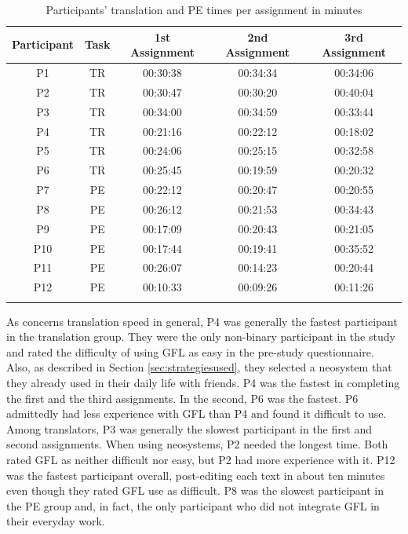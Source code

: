 \begin{table}[ht]
\caption{Participants' translation and PE times per assignment in minutes}
    \centering
    \begin{tabular}{ccccc} \lsptoprule
      \textbf{Participant} & \textbf{Task} & \textbf{1st Assignment} & \textbf{2nd Assignment} & \textbf{3rd Assignment} \\
      \midrule
       P1 & TR & \cellcolor{yellow!25}00:30:38 & \cellcolor{red!25}00:34:34 & 00:34:06 \\
       P2 & TR & 00:30:47 & \cellcolor{yellow!25}00:30:20 & \cellcolor{red!25}00:40:04 \\
       P3 & TR & 00:34:00 & \cellcolor{red!25}00:34:59 & \cellcolor{yellow!25}00:33:44 \\
       P4 & TR & 00:21:16 & \cellcolor{red!25}00:22:12 & \cellcolor{yellow!25}00:18:02 \\
       P5 & TR & \cellcolor{yellow!25}00:24:06 & 00:25:15 & \cellcolor{red!25}00:32:58 \\
       P6 & TR & \cellcolor{red!25}00:25:45 & \cellcolor{yellow!25}00:19:59 & 00:20:32 \\ \midrule
       P7 & PE & \cellcolor{red!25}00:22:12 & \cellcolor{yellow!25}00:20:47 & 00:20:55 \\
       P8 & PE & 00:26:12 & \cellcolor{yellow!25}00:21:53 & \cellcolor{red!25}00:34:43 \\
       P9 & PE & \cellcolor{yellow!25}00:17:09 & 00:20:43 & \cellcolor{red!25}00:21:05 \\
       P10 & PE & \cellcolor{yellow!25}00:17:44 & 00:19:41 & \cellcolor{red!25}00:35:52 \\
       P11 & PE & \cellcolor{red!25}00:26:07 & \cellcolor{yellow!25}00:14:23 & 00:20:44 \\
       P12 & PE & 00:10:33 & \cellcolor{yellow!25}00:09:26 & \cellcolor{red!25}00:11:26 \\
\lspbottomrule
    \end{tabular}
    \label{tab:generaltimes}
\end{table}

As concerns translation speed in general, P4 was generally the fastest participant in the translation group. They were the only non-binary participant in the study and rated the difficulty of using GFL as easy in the pre-study questionnaire. Also, as described in Section \ref{sec:strategiesused}, they selected a neosystem that they already used in their daily life with friends. P4 was the fastest in completing the first and the third assignments. In the second, P6 was the fastest. P6 admittedly had less experience with GFL than P4 and found it difficult to use. Among translators, P3 was generally the slowest participant in the first and second assignments. When using neosystems, P2 needed the longest time. Both rated GFL as neither difficult nor easy, but P2 had more experience with it. P12 was the fastest participant overall, post-editing each text in about ten minutes even though they rated GFL use as difficult. P8 was the slowest participant in the PE group and, in fact, the only participant who did not integrate GFL in their everyday work.

